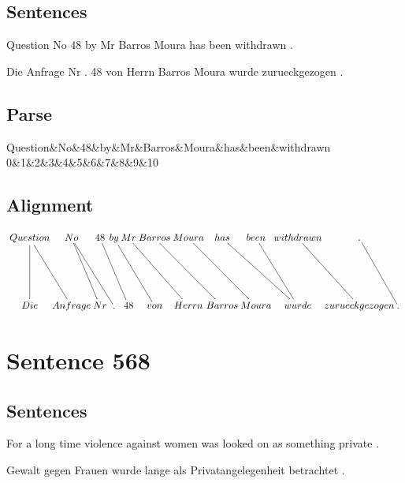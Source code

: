 \documentclass{report}
\begin{document}
\subsection*{Sentences}
Question No 48 by Mr Barros Moura has been withdrawn .

\noindent Die Anfrage Nr . 48 von Herrn Barros Moura wurde zurueckgezogen .



\subsection*{Parse}
\begin{dependency}[theme=simple]
\begin{deptext}[column sep=.5cm, row sep=.1ex]
Question\&No\&48\&by\&Mr\&Barros\&Moura\&has\&been\&withdrawn\\
0\&1\&2\&3\&4\&5\&6\&7\&8\&9\&10\\
\end{deptext}
\end{dependency}


\subsection*{Alignment}
\scriptsize{
$
\xymatrix@C-2.3pc{
Question \ar @{-} [ddr] \ar @{-} [dd] & No \ar @{-} [ddr] \ar @{-} [ddrr] & 48 \ar @{-} [ddrr] & by \ar @{-} [ddrr] & Mr \ar @{-} [ddrr] & Barros \ar @{-} [ddrr] & Moura \ar @{-} [ddrr] & has \ar @{-} [ddrr] & been \ar @{-} [ddr] & withdrawn \ar @{-} [ddr] & . \ar @{-} [ddr]\\\\
Die & Anfrage & Nr & . & 48 & von & Herrn & Barros & Moura & wurde & zurueckgezogen & .
}$}
\newpage\section*{Sentence 568}

\subsection*{Sentences}
For a long time violence against women was looked on as something private .

\noindent Gewalt gegen Frauen wurde lange als Privatangelegenheit betrachtet .
\end{document}
